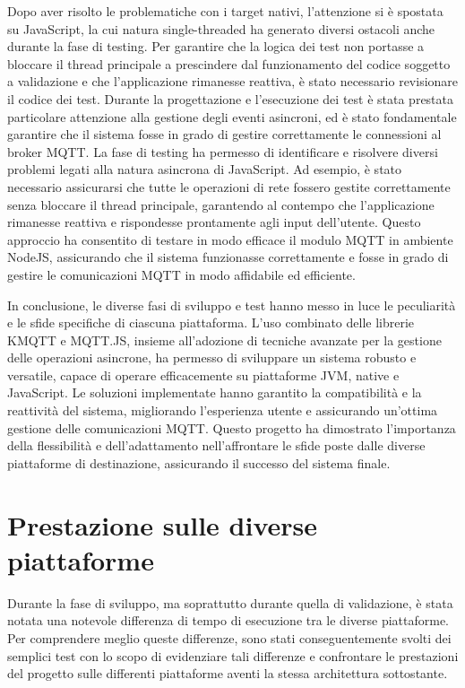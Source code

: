 \documentclass[12pt,a4paper,openright,twoside]{book}
\begin{document}
Dopo aver risolto le problematiche con i target nativi, l'attenzione si è spostata su JavaScript, la cui natura single-threaded ha generato diversi ostacoli anche durante 
la fase di testing. Per garantire che la logica dei test non portasse a bloccare il thread principale a prescindere dal funzionamento del codice soggetto a validazione e che 
l'applicazione rimanesse reattiva, è stato necessario revisionare il codice dei test. Durante la progettazione e l'esecuzione dei test è stata prestata particolare attenzione 
alla gestione degli eventi asincroni, ed è stato fondamentale garantire che il sistema fosse in grado di gestire correttamente le connessioni al broker \ac{MQTT}. 
La fase di testing ha permesso di identificare e risolvere diversi problemi legati alla natura asincrona di JavaScript. Ad esempio, è stato necessario assicurarsi 
che tutte le operazioni di rete fossero gestite correttamente senza bloccare il thread principale, garantendo al contempo che l'applicazione rimanesse reattiva 
e rispondesse prontamente agli input dell'utente. Questo approccio ha consentito di testare in modo efficace il modulo \ac{MQTT} in ambiente NodeJS, 
assicurando che il sistema funzionasse correttamente e fosse in grado di gestire le comunicazioni \ac{MQTT} in modo affidabile ed efficiente.

In conclusione, le diverse fasi di sviluppo e test hanno messo in luce le peculiarità e le sfide specifiche di ciascuna piattaforma. 
L'uso combinato delle librerie KMQTT e MQTT.JS, insieme all'adozione di tecniche avanzate per la gestione delle operazioni asincrone, 
ha permesso di sviluppare un sistema robusto e versatile, capace di operare efficacemente su piattaforme \ac{JVM}, native e JavaScript. 
Le soluzioni implementate hanno garantito la compatibilità e la reattività del sistema, migliorando l'esperienza utente e assicurando un'ottima gestione 
delle comunicazioni \ac{MQTT}. Questo progetto ha dimostrato l'importanza della flessibilità e dell'adattamento nell'affrontare le sfide poste dalle diverse 
piattaforme di destinazione, assicurando il successo del sistema finale.

\pagebreak
\section{Prestazione sulle diverse piattaforme}

Durante la fase di sviluppo, ma soprattutto durante quella di validazione, è stata notata una notevole differenza di tempo di esecuzione tra le diverse piattaforme. 
Per comprendere meglio queste differenze, sono stati conseguentemente svolti dei semplici test con lo scopo di evidenziare tali differenze e confrontare le prestazioni 
del progetto sulle differenti piattaforme aventi la stessa architettura sottostante.
\end{document}
